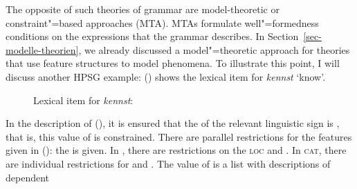 The opposite of such theories of grammar are model-theoretic or constraint"=based approaches (MTA).
MTAs formulate well"=formedness conditions on the expressions that the grammar describes.
In Section~\ref{sec-modelle-theorien}, we already discussed a model"=theoretic approach for theories that use
feature structures to model phenomena. To illustrate this point, I will discuss another HPSG example:
() shows the lexical item for \emph{kennst} `know'. %
\begin{figure}
\eas
Lexical item for \emph{kennst}:\\
\label{le-kennst-mts}%
\zs
\vspace{-\baselineskip}
\end{figure}
In the description of (), it is ensured that the \phonv of the relevant linguistic sign is
, that is, this value of \phon is constrained. There are parallel restrictions for the features given in (): the \synsemv
is given. In \synsem, there are restrictions on the \textsc{loc} and \nonlocv. In \textsc{cat}, there are
individual restrictions for \head and \comps. The value of \comps is a list with descriptions of dependent
